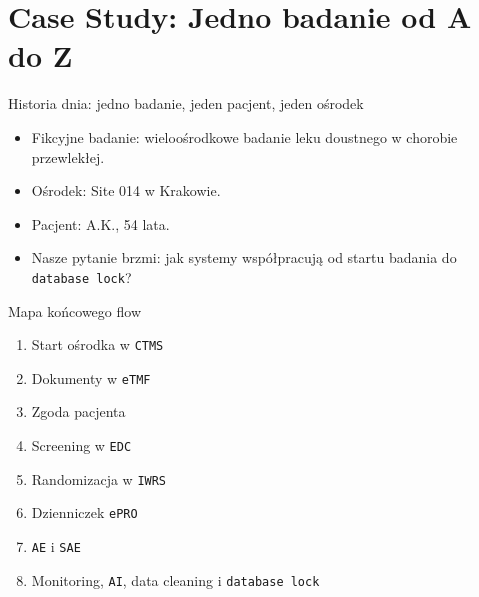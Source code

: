 \section{Case Study: Jedno badanie od A do Z}


\begin{frame}{Historia dnia: jedno badanie, jeden pacjent, jeden ośrodek}
  \begin{itemize}
    \item Fikcyjne badanie: wieloośrodkowe badanie leku doustnego w chorobie przewlekłej.
    \item Ośrodek: Site 014 w Krakowie.
    \item Pacjent: A.K., 54 lata.
    \item Nasze pytanie brzmi: jak systemy współpracują od startu badania do \texttt{database lock}?
  \end{itemize}
\end{frame}

\begin{frame}{Mapa końcowego flow}
  \begin{enumerate}
    \item Start ośrodka w \texttt{CTMS}
    \item Dokumenty w \texttt{eTMF}
    \item Zgoda pacjenta
    \item Screening w \texttt{EDC}
    \item Randomizacja w \texttt{IWRS}
    \item Dzienniczek \texttt{ePRO}
    \item \texttt{AE} i \texttt{SAE}
    \item Monitoring, \texttt{AI}, data cleaning i \texttt{database lock}
  \end{enumerate}
\end{frame}

